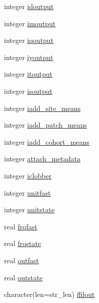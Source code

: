 \begin{DoxyCompactItemize}
\item 
integer \hyperlink{structename__coms_1_1ename__vars_a98576cf06ad449dd23b2c8dc236a978f}{idoutput}
\item 
integer \hyperlink{structename__coms_1_1ename__vars_a01ff10c23585f9843bf07ff9d5785af0}{imoutput}
\item 
integer \hyperlink{structename__coms_1_1ename__vars_a0ecbeea4cf98e94d1e76b1b7e6642e8a}{iqoutput}
\item 
integer \hyperlink{structename__coms_1_1ename__vars_ab00dd5a2b1950194883e0dd9915cf78d}{iyoutput}
\item 
integer \hyperlink{structename__coms_1_1ename__vars_a69bdaa648e6301919377750c9f97cac0}{itoutput}
\item 
integer \hyperlink{structename__coms_1_1ename__vars_a167b9eee65e2c1ada2d17e6b7c0b9386}{isoutput}
\item 
integer \hyperlink{structename__coms_1_1ename__vars_a727695c96698d53e388864da9b31f6b2}{iadd\+\_\+site\+\_\+means}
\item 
integer \hyperlink{structename__coms_1_1ename__vars_a40e04867d5d246e9b820bd5d6d3571fc}{iadd\+\_\+patch\+\_\+means}
\item 
integer \hyperlink{structename__coms_1_1ename__vars_a9a4dbe4c8d772460eaba77150978cf5c}{iadd\+\_\+cohort\+\_\+means}
\item 
integer \hyperlink{structename__coms_1_1ename__vars_a9cf2efc142f6cb76c780352ffa1d2ab0}{attach\+\_\+metadata}
\item 
integer \hyperlink{structename__coms_1_1ename__vars_a1f6499ec43d8aed5f03786218dfe8006}{iclobber}
\item 
integer \hyperlink{structename__coms_1_1ename__vars_a678ebe9563aaedd6ff1b25d02010be30}{unitfast}
\item 
integer \hyperlink{structename__coms_1_1ename__vars_abf5ccb57bb90cec04cce963ba5a50c43}{unitstate}
\item 
real \hyperlink{structename__coms_1_1ename__vars_ad9d6fa879751b6ac9c7c6f9d4c61d32b}{frqfast}
\item 
real \hyperlink{structename__coms_1_1ename__vars_ac253aad0f5ce409e905ec9fa0e502ece}{frqstate}
\item 
real \hyperlink{structename__coms_1_1ename__vars_a077ce688efd456c87c6c795cc22a7740}{outfast}
\item 
real \hyperlink{structename__coms_1_1ename__vars_aa50950a646209be585ff2938fde9edcf}{outstate}
\item 
character(len=str\+\_\+len) \hyperlink{structename__coms_1_1ename__vars_a435668b7df87c4c3b26a91c32f46a781}{ffilout}

\end{DoxyCompactItemize}
